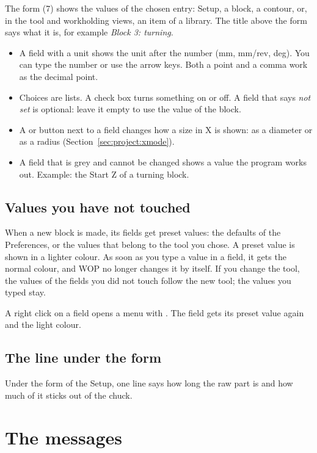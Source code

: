 The form (7) shows the values of the chosen entry: Setup, a block, a contour, or, in the tool and workholding views, an item of a library. The title above the form says what it is, for example \emph{Block 3: turning}.

\begin{itemize}
\item A field with a unit shows the unit after the number (mm, mm/rev, deg). You can type the number or use the arrow keys. Both a point and a comma work as the decimal point.
\item Choices are lists. A check box turns something on or off. A field that says \emph{not set} is optional: leave it empty to use the value of the block.
\item A  or  button next to a field changes how a size in X is shown: as a diameter or as a radius (Section~\ref{sec:project:xmode}).
\item A field that is grey and cannot be changed shows a value the program works out. Example: the Start Z of a turning block.
\end{itemize}

\subsection{Values you have not touched}
When a new block is made, its fields get preset values: the defaults of the Preferences, or the values that belong to the tool you chose. A preset value is shown in a lighter colour. As soon as you type a value in a field, it gets the normal colour, and WOP no longer changes it by itself. If you change the tool, the values of the fields you did not touch follow the new tool; the values you typed stay.

A right click on a field opens a menu with . The field gets its preset value again and the light colour.

\subsection{The line under the form}
Under the form of the Setup, one line says how long the raw part is and how much of it sticks out of the chuck.

\section{The messages}\label{sec:window:messages}

